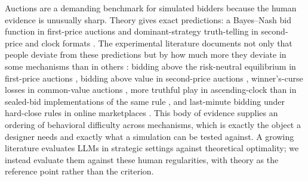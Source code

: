 \documentclass[acmsmall,screen,review]{acmart}
\begin{document}
Auctions are a demanding benchmark for simulated bidders because the human evidence is unusually sharp.
Theory gives exact predictions: a Bayes--Nash bid function in first-price auctions and dominant-strategy truth-telling in second-price and clock formats \citep{myerson1981optimal, krishna2009auction}.
The experimental literature documents not only that people deviate from these predictions but by how much more they deviate in some mechanisms than in others \citep{kagel2020handbook}: bidding above the risk-neutral equilibrium in first-price auctions \citep{coppinger1980incentives, cox1988theory}, bidding above value in second-price auctions \citep{kagel1993independent}, winner's-curse losses in common-value auctions \citep{bazerman1983won, kagel1986winner}, more truthful play in ascending-clock than in sealed-bid implementations of the same rule \citep{li2017obviously, breitmoser2022obviousness}, and last-minute bidding under hard-close rules in online marketplaces \citep{roth2002last, ockenfels2006late}.
This body of evidence supplies an ordering of behavioral difficulty across mechanisms, which is exactly the object a designer needs and exactly what a simulation can be tested against.
A growing literature evaluates LLMs in strategic settings against theoretical optimality; we instead evaluate them against these human regularities, with theory as the reference point rather than the criterion.
\end{document}

